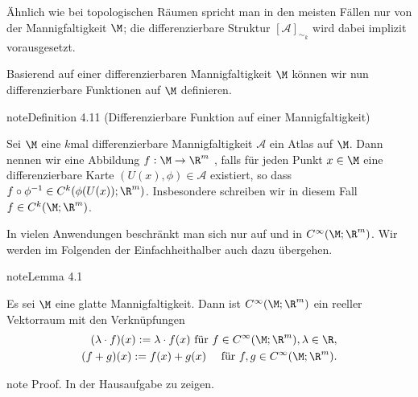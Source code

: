 \documentclass[letterpaper,10pt,english]{jupyterBook}
\begin{document}
\sphinxAtStartPar
Ähnlich wie bei topologischen Räumen spricht man in den meisten Fällen nur von der Mannigfaltigkeit \(\M\); die differenzierbare Struktur \([\mathcal{A}]_{\sim_k}\) wird dabei implizit vorausgesetzt.

\sphinxAtStartPar
Basierend auf einer differenzierbaren Mannigfaltigkeit \(\M\) können wir nun differenzierbare Funktionen auf \(\M\) definieren.
\label{manifolds/manifolds_prelim:definition-14}
\begin{sphinxadmonition}{note}{Definition 4.11 (Differenzierbare Funktion auf einer Mannigfaltigkeit)}



\sphinxAtStartPar
Sei \(\M\) eine \(k\)\sphinxhyphen{}mal differenzierbare Mannigfaltigkeit \(\mathcal{A}\) ein Atlas auf \(\M\).
Dann nennen wir eine Abbildung \(f:\M\to\R^m\) , falls für jeden Punkt \(x\in\M\) eine differenzierbare Karte \((U(x),\phi)\in\mathcal{A}\) existiert, so dass \(f\circ\phi^{-1} \in C^k(\phi(U(x)); \R^m)\).
Insbesondere schreiben wir in diesem Fall \(f\in C^k(\M; \R^m)\).
\end{sphinxadmonition}

\sphinxAtStartPar
In vielen Anwendungen beschränkt man sich nur auf  und  in \(C^\infty(\M; \R^m)\).
Wir werden im Folgenden der Einfachheit\sphinxhyphen{}halber auch dazu übergehen.
\label{manifolds/manifolds_prelim:lemma-15}
\begin{sphinxadmonition}{note}{Lemma 4.1}



\sphinxAtStartPar
Es sei \(\M\) eine glatte Mannigfaltigkeit.
Dann ist \(C^\infty(\M; \R^m)\) ein reeller Vektorraum mit den Verknüpfungen
\begin{equation*}
\begin{split}(\lambda \cdot f)(x) := \lambda\cdot f(x)\text{ für } f\in C^\infty(\M; \R^m), \lambda\in\R,\\
(f + g)(x) := f(x) + g(x)\quad\text{ für } f,g\in C^\infty(\M; \R^m).\end{split}
\end{equation*}\end{sphinxadmonition}

\begin{sphinxadmonition}{note}
\sphinxAtStartPar
Proof. In der Hausaufgabe zu zeigen.
\end{sphinxadmonition}
\end{document}
